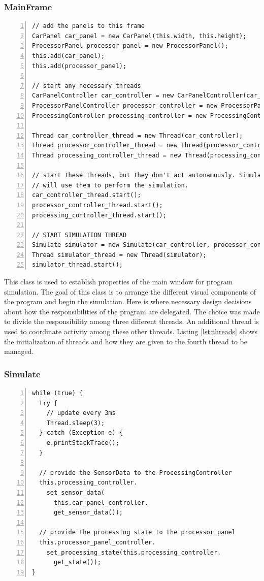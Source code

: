 \documentclass{article} %
\begin{document}
\subsubsection{MainFrame}
\begin{lstlisting}[float=*,caption={Setup Threads},label={lst:threads},numbers=left]
// add the panels to this frame
CarPanel car_panel = new CarPanel(this.width, this.height);
ProcessorPanel processor_panel = new ProcessorPanel();
this.add(car_panel);
this.add(processor_panel);

// start any necessary threads
CarPanelController car_controller = new CarPanelController(car_panel);
ProcessorPanelController processor_controller = new ProcessorPanelController(processor_panel);
ProcessingController processing_controller = new ProcessingController(scheduling_algorithm, n_processors);

Thread car_controller_thread = new Thread(car_controller);
Thread processor_controller_thread = new Thread(processor_controller);
Thread processing_controller_thread = new Thread(processing_controller);
    
// start these threads, but they don't act autonamously. Simulate thread
// will use them to perform the simulation.
car_controller_thread.start();
processor_controller_thread.start();
processing_controller_thread.start();

// START SIMULATION THREAD
Simulate simulator = new Simulate(car_controller, processor_controller, processing_controller, width, height);
Thread simulator_thread = new Thread(simulator);
simulator_thread.start();
\end{lstlisting}

This class is used to establish properties of the main window for program simulation.
The goal of this class is to arrange the different visual components of the program and begin the simulation.
Here is where necessary design decisions about how the responsibilities of the program are delegated.
The choice was made to divide the responsibility among three different threads. An additional thread is used to coordinate activity among these other threads.
Listing \ref{lst:threads} shows the initialization of threads and how they are given to the fourth thread to be managed.

\subsubsection{Simulate}
\begin{lstlisting}[caption={Simulate Update Procedure},label={lst:simulate},numbers=left]
while (true) {
  try {
    // update every 3ms
    Thread.sleep(3);
  } catch (Exception e) {
    e.printStackTrace();
  }

  // provide the SensorData to the ProcessingController
  this.processing_controller.
    set_sensor_data(
      this.car_panel_controller.
      get_sensor_data());

  // provide the processing state to the processor panel
  this.processor_panel_controller.
    set_processing_state(this.processing_controller.
      get_state());
}
\end{lstlisting}
\end{document}
